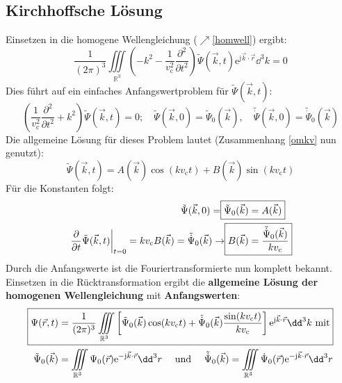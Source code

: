   \subsection{Kirchhoffsche Lösung}\label{kirchlsg}
		  Einsetzen in die homogene Wellengleichung ($\nearrow$\ref{homwell}) ergibt:
		        \begin{equation}
			        \frac{1}{(2\pi)^3}\iiint\limits_{\mathbb{R}^3} \left(-k^2 -\frac{1}{ v_\mathrm{c}^2}\frac{\partial^2}{\partial t^2}\right)\tilde{\Psi} (\vec{k}, t)  \mathrm{e}^{\mathrm{j}\vec{k}\cdot\vec{r} } \dd^3 k = 0
		        \end{equation}
		  Dies führt auf ein einfaches Anfangswertproblem für \(\tilde{\Psi} (\vec{k}, t)\):
		        \begin{equation}
			        \left(\frac{1}{ v_\mathrm{c}^2}\frac{\partial^2}{\partial t^2} + k^2 \right)\tilde{\Psi} (\vec{k}, t) =0 ; \quad \tilde{\Psi}(\vec{k}, 0) = \tilde{\Psi}_0(\vec{k}), \quad \tilde{\dot{\Psi}}(\vec{k}, 0) = \tilde{\dot{\Psi}}_0(\vec{k})
		        \end{equation}
		  Die allgemeine Lösung für dieses Problem lautet (Zusammenhang \ref{omkv} nun genutzt): 
		  \begin{equation}
		  	\boxed{\tilde{\Psi} (\vec{k}, t) = A(\vec{k}) \cos( k v_\mathrm{c}t) + B(\vec{k}) \sin( k v_\mathrm{c}t)}
		  \end{equation}
		  Für die Konstanten folgt: 
		  \begin{equation}\begin{split} \tilde{\Psi}(\vec{k}, 0) = \Aboxed{\tilde{\Psi}_0(\vec{k}) &= A(\vec{k})} \\
		       \left. \frac{\partial}{\partial t} \tilde{\Psi}(\vec{k}, t)\right|_{t=0}  =  k v_\mathrm{c} B(\vec{k}) = \tilde{\dot{\Psi}}_0(\vec{k}) \to \Aboxed{B(\vec{k}) &= \frac{\tilde{\dot{\Psi}}_0(\vec{k})}{ k v_\mathrm{c}}}\end{split}\end{equation}
	       Durch die Anfangswerte ist die Fouriertransformierte nun komplett bekannt. Einsetzen in die Rücktransformation ergibt die \textbf{allgemeine Lösung der homogenen Wellengleichung} mit \textbf{Anfangswerten}:
		        \begin{align}\label{allglsganf}
			        \Aboxed{\Psi(\vec{r} , t) & = \frac{1}{(2\pi)^3}\iiint\limits_{\mathbb{R}^3} \left[ \tilde{\Psi}_0(\vec{k}) \cos( k v_\mathrm{c}t) + \tilde{\dot{\Psi}}_0(\vec{k}) \frac{\sin( k v_\mathrm{c}t)}{ k v_\mathrm{c}} \right] \mathrm{e}^{\mathrm{j}\vec{k}\cdot\vec{r} } \dd^3 k \text{ mit}}                            \\
			        \tilde{\Psi}_0(\vec{k})   & = \iiint\limits_{\mathbb{R}^3} \Psi_0 (\vec{r} )  \mathrm{e}^{-\mathrm{j}\vec{k}\cdot\vec{r} } \dd^3 r \quad \text{ und } \quad\tilde{\dot{\Psi}}_0(\vec{k}) = \iiint\limits_{\mathbb{R}^3} \dot{\Psi}_0 (\vec{r} )  \mathrm{e}^{-\mathrm{j}\vec{k}\cdot\vec{r} } \dd^3 r \nonumber
		        \end{align}
